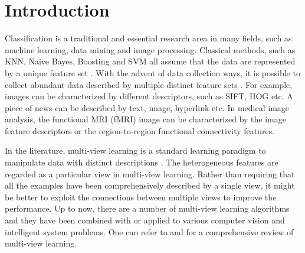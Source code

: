 \documentclass[10pt,journal,compsoc]{IEEEtran}
\begin{document}
\maketitle

\IEEEdisplaynontitleabstractindextext


\section{Introduction}

Classification is a traditional and essential research area in many fields, such as machine learning, data mining and image processing. Classical methods, such as KNN, Naive Bayes, Boosting and SVM all assume that the data are represented by a unique feature set \cite{Bishop:2006:PRM}. With the advent of data collection ways, it is possible to collect abundant data described by multiple distinct feature sets \cite{xu2013MVLsurvey, ZhaoXXS17, ChenZSX12, HouNTY17}. For example, images can be characterized by different descriptors, such as SIFT, HOG etc. A piece of news can be described by text, image, hyperlink etc. In medical image analysis, the functional MRI (fMRI) image can be characterized by the image feature descriptors or the region-to-region functional connectivity features.

In the literature, multi-view learning is a standard learning paradigm to manipulate data with distinct descriptions \cite{xu2013MVLsurvey, ZhaoXXS17, ChenZSX12, HouNTY17}. The heterogeneous features are regarded as a particular view in multi-view learning. Rather than requiring that all the examples have been comprehensively described by a single view, it might be better to exploit the connections between multiple views to improve the performance. Up to now, there are a number of multi-view learning algorithms and they have been combined with or applied to various computer vision and intelligent system problems. One can refer to \cite{xu2013MVLsurvey} and \cite{ZhaoXXS17} for a comprehensive review of multi-view learning.
\end{document}

